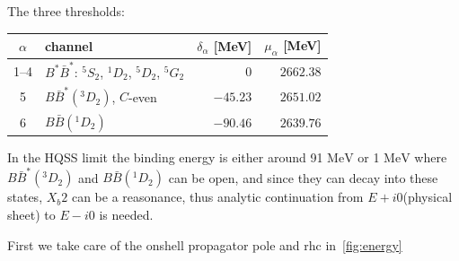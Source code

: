 \documentclass[aps,prl,showpacs,amsmath,onecolumn,superscriptaddress,floatfix,nofootinbib,notitlepage]{revtex4-2}
\newcommand{\MeV}{\mathrm{MeV}}
\begin{document}
The three thresholds:
\begin{center}
	\begin{tabular}{clrr}
		\toprule
		$\alpha$ & channel                                           & $\delta_\alpha$ [MeV] & $\mu_\alpha$ [MeV] \\
		\midrule
		1--4     & $B^*\bar B^*$: $^5S_2$, $^1D_2$, $^5D_2$, $^5G_2$ & $0$                   & $2662.38$          \\
		5        & $B\bar B^*(^3D_2)$, $C$-even                      & $-45.23$              & $2651.02$          \\
		6        & $B\bar B(^1D_2)$                                  & $-90.46$              & $2639.76$          \\
		\bottomrule
	\end{tabular}
\end{center}

In the HQSS limit the binding energy is either around 91 $\MeV$ or 1 $\MeV$ where $B\bar B^*(^3D_2)$ and $B\bar B(^1D_2)$ can be open, and since they can decay into these states, $X_b2$ can be a reasonance, thus analytic continuation from $E+i0$(physical sheet) to $E-i0$ is needed.

First we take care of the onshell propagator pole and rhc in~\ref{fig:energy}
\end{document}
